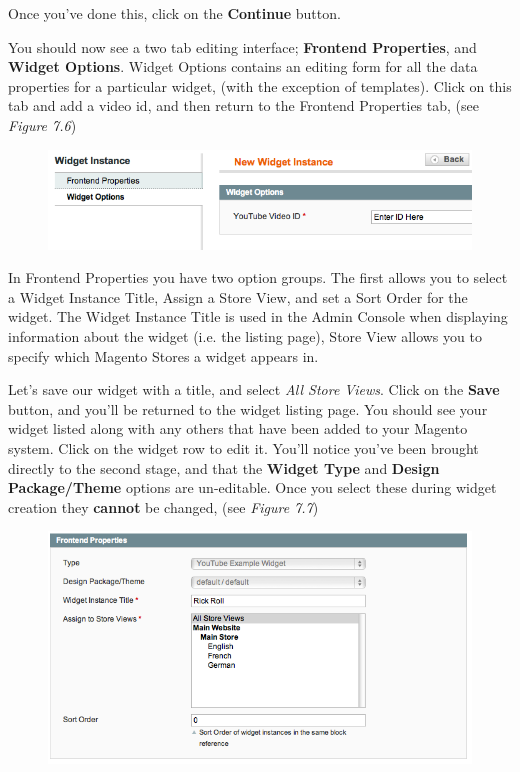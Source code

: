 \documentclass[oneside]{book}
\begin{document}
Once you've done this, click on the \textbf{Continue} button.  

You should now see a two tab editing interface; \textbf{Frontend Properties}, and \textbf{Widget Options}.    Widget Options contains an editing form for all the data properties for a particular widget, (with the exception of templates).  Click on this tab and add a video id, and then return to the Frontend Properties tab, (see \emph{Figure 7.6}) 

\begin{figure}[htb]
\begin{center}
\leavevmode
\includegraphics[width=1\textwidth]{images/chapter7/instance-set-data.png}
\end{center}
\caption{}
\end{figure}


In Frontend Properties you have two option groups.  The first allows you to select a Widget Instance Title, Assign a Store View, and set a Sort Order for the widget.  The Widget Instance Title is used in the Admin Console when displaying information about the widget (i.e. the listing page), Store View allows you to specify which Magento Stores a widget appears in.

Let's save our widget with a title, and select \emph{All Store Views}.  Click on the \textbf{Save} button, and you'll be returned to the widget listing page.  You should see your widget listed along with any others that have been added to your Magento system.  Click on the widget row to edit it.  You'll notice you've been brought directly to the second stage, and that the \textbf{Widget Type} and \textbf{Design Package/Theme} options are un-editable. Once you select these during widget creation they \textbf{cannot} be changed, (see \emph{Figure 7.7}) 

\begin{figure}[htb]
\begin{center}
\leavevmode
\includegraphics[width=1\textwidth]{images/chapter7/instance-step2-always.png}
\end{center}
\caption{}
\end{figure}
\end{document}
